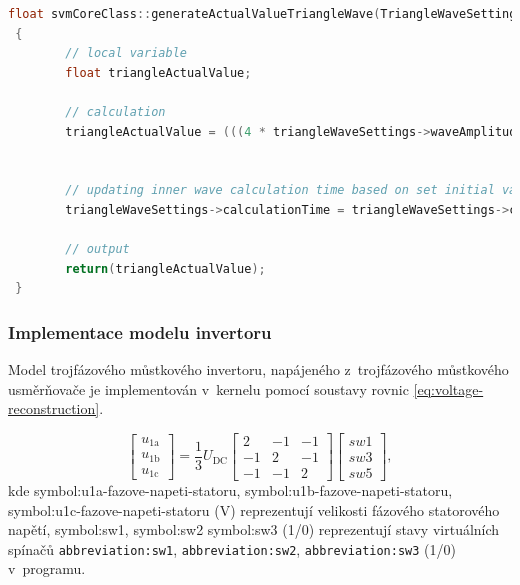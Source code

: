\documentclass[a4paper, twoside, 11pt]{article}
\begin{document}
			  \begin{lstlisting}[language={c++}, caption={Implementace výpočtu aktuální hodnoty pilovitého průběhu. Představená implementace používá struktury typu TriangleWaveSettingsType. Ve vytvořeném kernelu je místo struktury použito pole typu float.}, label={lst:implementace-vypoctu-triangle-actual-value}]
float svmCoreClass::generateActualValueTriangleWave(TriangleWaveSettingsType *triangleWaveSettings)
 {
        // local variable
        float triangleActualValue;

        // calculation
        triangleActualValue = (((4 * triangleWaveSettings->waveAmplitude)/triangleWaveSettings->wavePeriod) * abs(fmod((fmod((triangleWaveSettings->calculationTime-(triangleWaveSettings->wavePeriod/4)), triangleWaveSettings->wavePeriod) +  triangleWaveSettings->wavePeriod),  triangleWaveSettings->wavePeriod) - ( triangleWaveSettings->wavePeriod/2)) - triangleWaveSettings->waveAmplitude);


        // updating inner wave calculation time based on set initial value of calculationTime
        triangleWaveSettings->calculationTime = triangleWaveSettings->calculationTime + triangleWaveSettings->calculationStep;

        // output
        return(triangleActualValue);
 }\end{lstlisting}

		\subsubsection{Implementace modelu invertoru}
			Model trojfázového můstkového invertoru, napájeného z~trojfázového můstkového usměrňovače je implementován v~kernelu pomocí soustavy rovnic \ref{eq:voltage-reconstruction}. \cite{lipcak-bauer-ept-moodle}

			\begin{equation}
				\begin{bmatrix}
					u_\text{1a}\\
					u_\text{1b}\\
					u_\text{1c}
				\end{bmatrix}
				=
				\frac{1}{3} U_\text{DC}
				\begin{bmatrix}
					2 & -1 & -1\\
					-1 & 2 & -1\\
					-1 & -1 & 2
				\end{bmatrix}
				\begin{bmatrix}
					sw1\\
					sw3\\
					sw5
				\end{bmatrix},
				\label{eq:voltage-reconstruction}
			\end{equation}
			kde \gls{symbol:u1a-fazove-napeti-statoru}, \gls{symbol:u1b-fazove-napeti-statoru}, \gls{symbol:u1c-fazove-napeti-statoru} (V) reprezentují velikosti fázového statorového napětí, \gls{symbol:sw1}, \gls{symbol:sw2} \gls{symbol:sw3} (1/0) reprezentují stavy virtuálních spínačů \texttt{\gls{abbreviation:sw1}}, \texttt{\gls{abbreviation:sw2}}, \texttt{\gls{abbreviation:sw3}} (1/0) v~programu.
\end{document}
